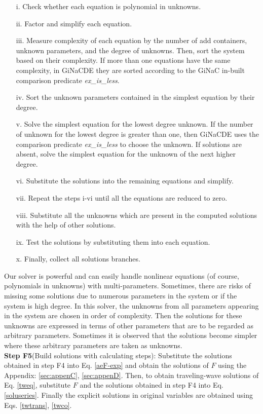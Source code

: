 \documentclass[prd,aps,floats,showkeys,nofootinbib,notitlepage]{revtex4-2}
\begin{document}
	\begin{itemize}
		\item[i.] Check whether each equation is polynomial in unknowns.
		\item[ii.] Factor and simplify each equation.
		\item[iii.] Measure complexity of each equation by the number of add containers, unknown parameters, and the degree of unknowns. Then, sort the system based on their complexity. If more than one equations have the same complexity, in GiNaCDE they are sorted according to the GiNaC in-built comparison predicate {\em ex\_is\_less}.
		\item[iv.] Sort the unknown parameters contained in the simplest equation by their degree.
		\item[v.] Solve the simplest equation for the lowest degree unknown. If the number of unknown for the lowest degree is greater than one, then GiNaCDE uses the comparison predicate {\em ex\_is\_less} to choose the unknown. If solutions are absent, solve the simplest equation for the unknown of the next higher degree. 
		\item[vi.] Substitute the solutions into the remaining equations and simplify.
		\item[vii.] Repeat the steps i-vi until all the equations are reduced to zero.
		\item[viii.] Substitute all the unknowns which are present in the computed solutions with the help of other solutions.
		\item[ix.] Test the solutions by substituting them into each equation.
		\item[x.] Finally, collect all solutions branches.
	\end{itemize}
	Our solver is powerful and can easily handle nonlinear equations (of course, polynomials in unknowns) with multi-parameters. Sometimes, there are risks of missing some solutions due to numerous parameters in the system or if the system is high degree. In this solver, the unknowns from all parameters appearing in the system are chosen in order of complexity. Then the solutions for these unknowns are expressed in terms of other parameters that are to be regarded as arbitrary parameters. Sometimes it is observed that the solutions become simpler where these arbitrary parameters are taken as unknowns.\\
	
	\textbf{Step F5}(Build solutions with calculating steps): Substitute the solutions obtained in step F4 into Eq. \eqref{aeF-exp}  and obtain the solutions of $F$ using the Appendix: \ref{sec:appenC}, \ref{sec:appenD}. Then, to obtain traveling-wave solutions of Eq. \eqref{tweq}, substitute $F$ and the solutions obtained in step F4 into Eq. \eqref{soluseries}. Finally the explicit solutions in original variables are obtained using Eqs. \eqref{twtrans}, \eqref{twco}.\\
	
\end{document}
